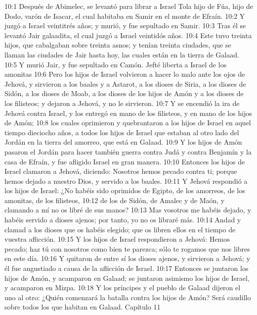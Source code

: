 10:1 Después de Abimelec, se levantó para librar a Israel Tola hijo de Fúa, hijo de Dodo, varón de Isacar, el cual habitaba en Samir en el monte de Efraín. 
10:2 Y juzgó a Israel veintitrés años; y murió, y fue sepultado en Samir.  
10:3 Tras él se levantó Jair galaadita, el cual juzgó a Israel veintidós años.  
10:4 Este tuvo treinta hijos, que cabalgaban sobre treinta asnos; y tenían treinta ciudades, que se llaman las ciudades de Jair hasta hoy, las cuales están en la tierra de Galaad.  
10:5 Y murió Jair, y fue sepultado en Camón.  
Jefté liberta a Israel de los amonitas  
10:6 Pero los hijos de Israel volvieron a hacer lo malo ante los ojos de Jehová, y sirvieron a los baales y a Astarot, a los dioses de Siria, a los dioses de Sidón, a los dioses de Moab, a los dioses de los hijos de Amón y a los dioses de los filisteos; y dejaron a Jehová, y no le sirvieron.  
10:7 Y se encendió la ira de Jehová contra Israel, y los entregó en mano de los filisteos, y en mano de los hijos de Amón;  
10:8 los cuales oprimieron y quebrantaron a los hijos de Israel en aquel tiempo dieciocho años, a todos los hijos de Israel que estaban al otro lado del Jordán en la tierra del amorreo, que está en Galaad.  
10:9 Y los hijos de Amón pasaron el Jordán para hacer también guerra contra Judá y contra Benjamín y la casa de Efraín, y fue afligido Israel en gran manera.  
10:10 Entonces los hijos de Israel clamaron a Jehová, diciendo: Nosotros hemos pecado contra ti; porque hemos dejado a nuestro Dios, y servido a los baales.  
10:11 Y Jehová respondió a los hijos de Israel: ¿No habéis sido oprimidos de Egipto, de los amorreos, de los amonitas, de los filisteos,  
10:12 de los de Sidón, de Amalec y de Maón, y clamando a mí no os libré de sus manos?  
10:13 Mas vosotros me habéis dejado, y habéis servido a dioses ajenos; por tanto, yo no os libraré más.  
10:14 Andad y clamad a los dioses que os habéis elegido; que os libren ellos en el tiempo de vuestra aflicción.  
10:15 Y los hijos de Israel respondieron a Jehová: Hemos pecado; haz tú con nosotros como bien te parezca; sólo te rogamos que nos libres en este día.  
10:16 Y quitaron de entre sí los dioses ajenos, y sirvieron a Jehová; y él fue angustiado a causa de la aflicción de Israel.  
10:17 Entonces se juntaron los hijos de Amón, y acamparon en Galaad; se juntaron asimismo los hijos de Israel, y acamparon en Mizpa.  
10:18 Y los príncipes y el pueblo de Galaad dijeron el uno al otro: ¿Quién comenzará la batalla contra los hijos de Amón? Será caudillo sobre todos los que habitan en Galaad.  
Capítulo 11 

